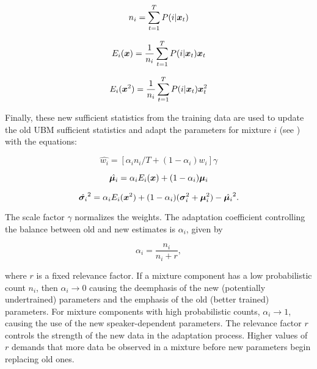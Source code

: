 \begin{equation}
    n_i = \sum_{t=1}^{T} \postprob{i}{\dvec{x}_t}
    \label{eq:n_i}
\end{equation}

\begin{equation}
    E_i(\dvec{x}) = \frac{1}{n_i} \sum_{t=1}^{T} \postprob{i}{\dvec{x}_t} \dvec{x}_t
    \label{eq:E_x}
\end{equation}

\begin{equation}
    E_i(\dvec{x}^2) = \frac{1}{n_i} \sum_{t=1}^{T} \postprob{i}{\dvec{x}_t} \dvec{x}_t^2
    \label{eq:E_x2}
\end{equation}

Finally, these new sufficient statistics from the training data are used to update the old UBM sufficient statistics and adapt the parameters for mixture $i$ (see ) with the equations:

\begin{equation}
    \hat{w_i} = [\alpha_i n_i / T + (1 - \alpha_i)w_i]\gamma
    \label{eq:adapted_weight}
\end{equation}

\begin{equation}
    \hat{\dvec{\mu}_i} = \alpha_i E_i(\dvec{x}) + (1 - \alpha_i)\dvec{\mu}_i
    \label{eq:adapted_means}
\end{equation}

\begin{equation}
    \hat{\dvec{\sigma}_i}^2 = \alpha_i E_i(\dvec{x}^2) + (1 - \alpha_i)(\dvec{\sigma}_i^2 + \dvec{\mu}_i^2) - \hat{\dvec{\mu}_i}^2.
    \label{eq:adapted_variances}
\end{equation}

The scale factor $\gamma$ normalizes the weights. \noindent The adaptation coefficient controlling the balance between old and new estimates is $\alpha_i$, given by

\begin{equation}
    \alpha_i = \frac{n_i}{n_i + r},
    \label{eq:alpha_i}
\end{equation}

\noindent where $r$ is a fixed relevance factor. If a mixture component has a low probabilistic count $n_i$, then $\alpha_i \to 0$ causing the deemphasis of the new (potentially undertrained) parameters and the emphasis of the old (better trained) parameters. For mixture components with high probabilistic counts, $\alpha_i \to 1$, causing the use of the new speaker-dependent parameters. The relevance factor $r$ controls the strength of the new data in the adaptation process. Higher values of $r$ demands that more data be observed in a mixture before new parameters begin replacing old ones.

